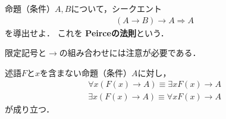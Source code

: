    \begin{que} \label{que:Peirce}
     命題（条件）$A,  B$について，シークエント
     \begin{align}
       (A \to B) \to A \Longrightarrow A
       \label{eq:Peircelaw}
     \end{align}
     を導出せよ．
     これを
     \textbf{Peirceの法則}という．
   \end{que}

   限定記号と$\to$の組み合わせには注意が必要である．
   \begin{thm} \label{thm:genteito}
     述語$F$と$x$を含まない命題（条件）$A$に対し，
     \begin{align}
       \forall x ( F(x) \to A ) \equiv \exists x F(x) \to A 
       \label{eq:foralltoA} \\
       \exists x ( F(x) \to A ) \equiv \forall x F(x) \to A
       \label{eq:existstoA}
     \end{align}
     が成り立つ．
   \end{thm}
